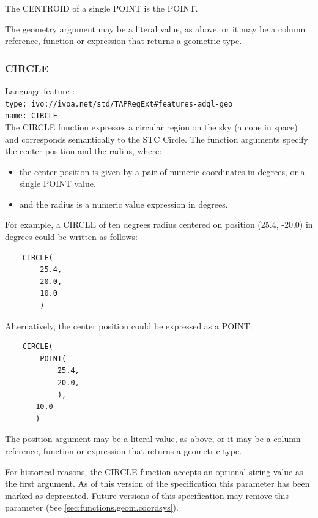 \documentclass[11pt,a4paper]{ivoa}
\begin{document}
The CENTROID of a single POINT is the POINT.

The geometry argument may be a literal value, as above, or it may be a
column reference, function or expression that returns a geometric type.

\subsubsection{CIRCLE}
\label{sec:functions.geom.circle}
{\footnotesize Language feature :}\\
{\footnotesize \verb|type: ivo://ivoa.net/std/TAPRegExt#features-adql-geo|}\\
{\footnotesize \verb|name: CIRCLE|}\\

The CIRCLE function expresses a circular region on the sky (a cone in space) and
corresponds semantically to the STC Circle.
The function arguments specify the center position and the radius, where:

\begin{itemize}
    \item the center position is given by a pair of numeric coordinates in degrees, or a single POINT value.
    \item and the radius is a numeric value expression in degrees.
\end{itemize}

For example, a CIRCLE of ten degrees radius centered on position
(25.4, -20.0) in degrees could be written as follows:
\begin{verbatim}
    CIRCLE(
        25.4,
       -20.0,
        10.0
        )
\end{verbatim}

Alternatively, the center position could be expressed as a POINT:
\begin{verbatim}
    CIRCLE(
        POINT(
            25.4,
           -20.0,
            ),
       10.0
       )
\end{verbatim}

The position argument may be a literal value, as above, or it may be a
column reference, function or expression that returns a geometric type.

For historical reasons, the CIRCLE function accepts an optional string
value as the first argument.
As of this version of the specification this parameter has been
marked as deprecated.
Future versions of this specification may remove this parameter
(See \ref{sec:functions.geom.coordsys}).
\end{document}
